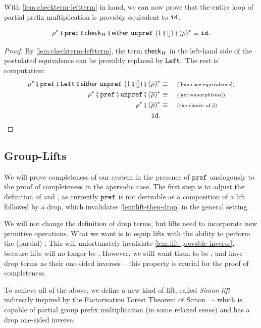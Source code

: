 With \cref{lem:checkterm-leftterm} in hand, we can now prove that the entire loop of partial prefix multiplication is provably equivalent to $\mathtt{id}$.

\begin{lemma}\label{lem:partial-prefix-multiplication}
    \[
        \rho^* \comp \prefterm \comp \checkterm_H \comp \either{\unprefterm}{(1\comp[])} \comp (\inv \rho)^* \equiv \idterm.
    \]
\end{lemma}
\begin{proof}
    By \cref{lem:checkterm-leftterm}, the term $\mathsf{check}_H$ in the left-hand side of the postulated equivalence can be provably replaced by $\mathtt{Left}$. The rest is computation:
    \begin{align*}
        \rho^* \comp \prefterm \comp \leftterm \comp \either{\unprefterm}{(1\comp[])} \comp (\inv \rho)^* \equalbecause{\cref{lem:case-equivalence}} \\
        \rho^* \comp \prefterm \comp \unprefterm \comp (\inv \rho)^* \equalbecause{\cref{ax:isomorphisms}} \\ 
        \rho^* \comp (\inv \rho)^* \equalbecause{the choice of $\inv \rho$} \\ 
        \idterm.
    \end{align*}
\end{proof}

\subsection{Group-Lifts}

We will prove completeness of our system in the presence of $\mathtt{pref}$ analogously to the proof of completeness in the aperiodic case. The first step is to adjust the definition of  and , as currently $\mathtt{pref}$ is not derivable as a composition of a lift followed by a drop, which invalidates \cref{lem:lift-then-drop} in the general setting. 

We will not change the definition of drop terms, but lifts need to incorporate new primitive operations. What we want is to equip lifts with the ability to perform the (partial) . This will unfortunately invalidate \cref{lem:lift-provable-inverse}, because lifts will no longer be . However, we still want them to be , and have drop terms as their one-sided inverses -- this property is crucial for the proof of completeness.

To achieve all of the above, we define a new kind of lift, called \emph{Simon lift} -- indirectly inspired by the Factorisation Forest Theorem of Simon~\cite{Simon1990} -- which is capable of partial group prefix multiplication (in some relaxed sense) and has a drop one-sided inverse.

